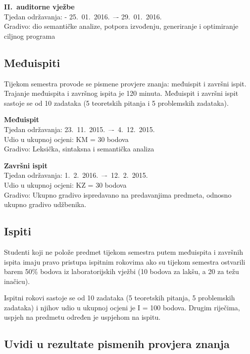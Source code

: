 \documentclass[times, 12pt, utf8]{book}
\begin{document}
\textbf{II.~auditorne vježbe} \\
Tjedan održavanja: -  25.~01.~2016.~–- 29.~01.~2016. \\
Gradivo: dio semantičke analize, potpora izvođenju, generiranje i optimiranje ciljnog programa


\cleardoublepage  
{}  
{}
\subsection*{Međuispiti}

Tijekom semestra provode se pismene provjere znanja: međuispit i završni ispit.
Trajanje međuispita i završnog ispita je 120 minuta.
Međuispit i završni ispit sastoje se od 10 zadataka (5 teoretskih pitanja i 5 problemskih zadataka).

\textbf{Međuispit} \\
Tjedan održavanja:  23.~11.~2015.~–-~4.~12.~2015. \\
Udio u ukupnoj ocjeni:  KM = 30 bodova \\
Gradivo: Leksička, sintaksna i semantička analiza

\textbf{Završni ispit} \\
Tjedan održavanja:  1.~2.~2016.~–-~12.~2.~2015. \\
Udio u ukupnoj ocjeni: KZ = 30 bodova \\
Gradivo: Ukupno gradivo ispredavano na predavanjima predmeta, odnosno ukupno gradivo udžbenika.

\cleardoublepage  
{}  
{}
\subsection*{Ispiti}

Studenti koji ne polože predmet tijekom semestra putem međuispita i završnih ispita imaju pravo pristupa ispitnim rokovima ako su tijekom semestra ostvarili barem 50\% bodova iz laboratorijskih vježbi (10 bodova za lakšu, a 20 za težu inačicu).

Ispitni rokovi sastoje se od 10 zadataka (5 teoretskih pitanja, 5 problemskih zadataka) i njihov udio u ukupnoj ocjeni je I = 100 bodova.
Drugim riječima, uspjeh na predmetu određen je uspjehom na ispitu.



\cleardoublepage  
{}  
{}
\subsection*{Uvidi u rezultate pismenih provjera znanja}
\end{document}
